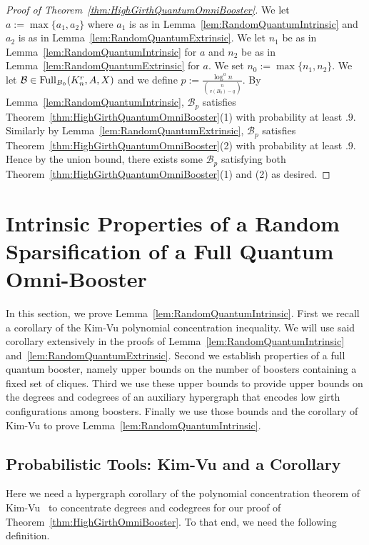 \documentclass[11pt]{article}
\newcommand{\mc}[1]{\mathcal{#1}}
\newcounter{i}
\theoremstyle{plain}
\theoremstyle{plain} %
\theoremstyle{definition}
\begin{document}
\begin{proof}[Proof of Theorem~\ref{thm:HighGirthQuantumOmniBooster}]
We let $a := \max \{a_1,a_2\}$ where $a_1$ is as in Lemma~\ref{lem:RandomQuantumIntrinsic} and $a_2$ is as in Lemma~\ref{lem:RandomQuantumExtrinsic}. We let $n_1$ be as in Lemma~\ref{lem:RandomQuantumIntrinsic} for $a$ and $n_2$ be as in Lemma~\ref{lem:RandomQuantumExtrinsic} for  $a$. We set $n_0:= \max\{n_1,n_2\}$. We let $\mc{B}\in {\rm Full}_{B_0}(K_n^r,A,X)$ and we define $p :=\frac{\log^{a} n}{\binom{n}{v(B_0)-q}}$. By Lemma~\ref{lem:RandomQuantumIntrinsic}, $\mc{B}_p$ satisfies Theorem~\ref{thm:HighGirthQuantumOmniBooster}(1) with probability at least $.9$. Similarly by Lemma~\ref{lem:RandomQuantumExtrinsic}, $\mc{B}_p$ satisfies Theorem~\ref{thm:HighGirthQuantumOmniBooster}(2) with probability at least $.9$. Hence by the union bound, there exists some $\mc{B}_p$ satisfying both Theorem~\ref{thm:HighGirthQuantumOmniBooster}(1) and (2) as desired.
\end{proof}

\section{Intrinsic Properties of a Random Sparsification of a Full Quantum Omni-Booster}\label{s:Intrinsic}

In this section, we prove Lemma~\ref{lem:RandomQuantumIntrinsic}. First we recall a corollary of the Kim-Vu polynomial concentration inequality. We will use said corollary extensively in the proofs of Lemma~\ref{lem:RandomQuantumIntrinsic} and~\ref{lem:RandomQuantumExtrinsic}. Second we establish properties of a full quantum booster, namely upper bounds on the number of boosters containing a fixed set of cliques. Third we use these upper bounds to provide upper bounds on the degrees and codegrees of an auxiliary hypergraph that encodes low girth configurations among boosters. Finally we use those bounds and the corollary of Kim-Vu to prove Lemma~\ref{lem:RandomQuantumIntrinsic}.

\subsection{Probabilistic Tools: Kim-Vu and a Corollary}

Here we need a hypergraph corollary of the polynomial concentration theorem of Kim-Vu~\cite{KV00} to concentrate degrees and codegrees for our proof of Theorem~\ref{thm:HighGirthOmniBooster}. To that end, we need the following definition.
\end{document}
